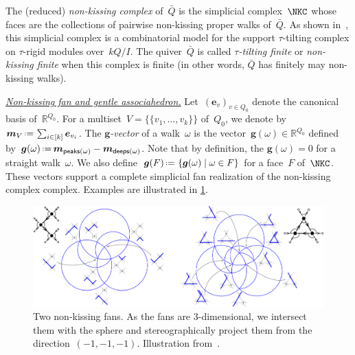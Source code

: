 \documentclass{amsart}
\theoremstyle{definition}
\newcommand{\R}{\mathbb{R}} %
\renewcommand{\b}[1]{{\boldsymbol{#1}}} %
\newcommand{\set}[2]{\left\{ #1 \;\middle|\; #2 \right\}} %
\newcommand{\eqdef}{\mbox{\,\raisebox{0.2ex}{\scriptsize\ensuremath{\mathrm:}}\ensuremath{=}\,}} %
\newcommand{\darkblue}{\color{darkblue}} %
\newcommand{\defn}[1]{\textsl{\darkblue #1}} %
\newcommand{\para}[1]{\medskip\noindent\uline{\textit{#1.}}} %
\newcommand{\multiplicityVector}{\b{m}} %
\newcommand{\gvector}[1]{\b{g}(#1)} %
\newcommand{\gvectors}[1]{\b{g}(#1)} %
\newcommand{\quiver}{\bar Q} %
\newcommand{\peaks}[1]{\mathsf{peaks}(#1)} %
\newcommand{\deeps}[1]{\mathsf{deeps}(#1)} %
\begin{document}
%
The (reduced) \defn{non-kissing complex} of~$\quiver$ is the simplicial complex~$\NKC$ whose faces are the collections of pairwise non-kissing proper walks of~$\quiver$.
As shown in~\cite[Thm.~2.46]{PaluPilaudPlamondon-nonkissing}, this simplicial complex is a combinatorial model for the support $\tau$-tilting complex on $\tau$-rigid modules over~$kQ/I$.
The quiver~$\quiver$ is called \defn{$\tau$-tilting finite} or \defn{non-kissing finite} when this complex is finite (in other words, $\quiver$ has finitely may non-kissing walks).

\para{Non-kissing fan and gentle associahedron}
%
Let~$(\b{e}_v)_{v \in Q_0}$ denote the canonical basis of~$\R^{Q_0}$.
For a multiset~$V = \{\!\{v_1, \dots, v_k\}\!\}$ of~$Q_0$, we denote by $\multiplicityVector_V \eqdef \sum_{i \in [k]} \b{e}_{v_i}$.
The \defn{$\b{g}$-vector} of a walk~$\omega$ is the vector~$\gvector{\omega} \in \R^{Q_0}$ defined by~$\gvector{\omega} \eqdef \multiplicityVector_{\peaks{\omega}} - \multiplicityVector_{\deeps{\omega}}$.
Note that by definition, the $\gvector{\omega} = 0$ for a straight walk~$\omega$.
We also define~$\gvectors{F} \eqdef \set{\gvector{\omega}}{\omega \in F}$ for a face~$F$ of~$\NKC$.
These vectors support a complete simplicial fan realization of the non-kissing complex complex.
Examples are illustrated in \cref{fig:nonkissingFans}.

\begin{figure}[h]
	\capstart
	\centerline{\includegraphics[scale=.45]{nonkissingFans}}
	\caption{Two non-kissing fans. As the fans are $3$-dimensional, we intersect them with the sphere and stereographically project them from the direction~$(-1,-1,-1)$. Illustration from~\cite{PaluPilaudPlamondon-nonkissing}.}
	\label{fig:nonkissingFans}
\end{figure}
\end{document}
